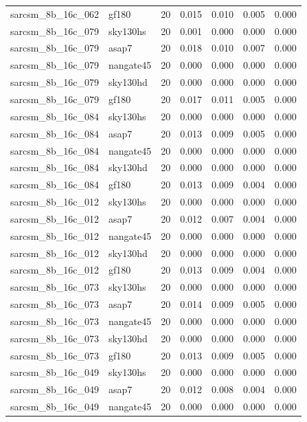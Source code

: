 \begin{tabular}{llrrrrr}
sarcsm\_8b\_16c\_062 & gf180 & 20 & 0.015 & 0.010 & 0.005 & 0.000 \\
sarcsm\_8b\_16c\_079 & sky130hs & 20 & 0.001 & 0.000 & 0.000 & 0.000 \\
sarcsm\_8b\_16c\_079 & asap7 & 20 & 0.018 & 0.010 & 0.007 & 0.000 \\
sarcsm\_8b\_16c\_079 & nangate45 & 20 & 0.000 & 0.000 & 0.000 & 0.000 \\
sarcsm\_8b\_16c\_079 & sky130hd & 20 & 0.000 & 0.000 & 0.000 & 0.000 \\
sarcsm\_8b\_16c\_079 & gf180 & 20 & 0.017 & 0.011 & 0.005 & 0.000 \\
sarcsm\_8b\_16c\_084 & sky130hs & 20 & 0.000 & 0.000 & 0.000 & 0.000 \\
sarcsm\_8b\_16c\_084 & asap7 & 20 & 0.013 & 0.009 & 0.005 & 0.000 \\
sarcsm\_8b\_16c\_084 & nangate45 & 20 & 0.000 & 0.000 & 0.000 & 0.000 \\
sarcsm\_8b\_16c\_084 & sky130hd & 20 & 0.000 & 0.000 & 0.000 & 0.000 \\
sarcsm\_8b\_16c\_084 & gf180 & 20 & 0.013 & 0.009 & 0.004 & 0.000 \\
sarcsm\_8b\_16c\_012 & sky130hs & 20 & 0.000 & 0.000 & 0.000 & 0.000 \\
sarcsm\_8b\_16c\_012 & asap7 & 20 & 0.012 & 0.007 & 0.004 & 0.000 \\
sarcsm\_8b\_16c\_012 & nangate45 & 20 & 0.000 & 0.000 & 0.000 & 0.000 \\
sarcsm\_8b\_16c\_012 & sky130hd & 20 & 0.000 & 0.000 & 0.000 & 0.000 \\
sarcsm\_8b\_16c\_012 & gf180 & 20 & 0.013 & 0.009 & 0.004 & 0.000 \\
sarcsm\_8b\_16c\_073 & sky130hs & 20 & 0.000 & 0.000 & 0.000 & 0.000 \\
sarcsm\_8b\_16c\_073 & asap7 & 20 & 0.014 & 0.009 & 0.005 & 0.000 \\
sarcsm\_8b\_16c\_073 & nangate45 & 20 & 0.000 & 0.000 & 0.000 & 0.000 \\
sarcsm\_8b\_16c\_073 & sky130hd & 20 & 0.000 & 0.000 & 0.000 & 0.000 \\
sarcsm\_8b\_16c\_073 & gf180 & 20 & 0.013 & 0.009 & 0.005 & 0.000 \\
sarcsm\_8b\_16c\_049 & sky130hs & 20 & 0.000 & 0.000 & 0.000 & 0.000 \\
sarcsm\_8b\_16c\_049 & asap7 & 20 & 0.012 & 0.008 & 0.004 & 0.000 \\
sarcsm\_8b\_16c\_049 & nangate45 & 20 & 0.000 & 0.000 & 0.000 & 0.000 \\

\end{tabular}
